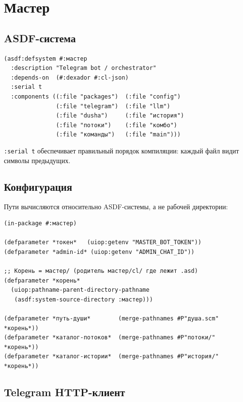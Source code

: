 \documentclass[11pt,a4paper]{article}
\begin{document}
\section{Мастер}

\subsection{ASDF-система}

\begin{lstlisting}[caption={мастер/cl/мастер.asd}]
(asdf:defsystem #:мастер
  :description "Telegram bot / orchestrator"
  :depends-on  (#:dexador #:cl-json)
  :serial t
  :components ((:file "packages")  (:file "config")
               (:file "telegram")  (:file "llm")
               (:file "dusha")     (:file "история")
               (:file "потоки")    (:file "комбо")
               (:file "команды")   (:file "main")))
\end{lstlisting}

\texttt{:serial t} обеспечивает правильный порядок компиляции: каждый файл видит символы предыдущих.

\subsection{Конфигурация}

Пути вычисляются относительно ASDF-системы, а не рабочей директории:

\begin{lstlisting}[caption={мастер/cl/config.lisp}]
(in-package #:мастер)

(defparameter *токен*   (uiop:getenv "MASTER_BOT_TOKEN"))
(defparameter *admin-id* (uiop:getenv "ADMIN_CHAT_ID"))

;; Корень = мастер/ (родитель мастер/cl/ где лежит .asd)
(defparameter *корень*
  (uiop:pathname-parent-directory-pathname
   (asdf:system-source-directory :мастер)))

(defparameter *путь-души*        (merge-pathnames #P"душа.scm"  *корень*))
(defparameter *каталог-потоков*  (merge-pathnames #P"потоки/"   *корень*))
(defparameter *каталог-истории*  (merge-pathnames #P"история/"  *корень*))
\end{lstlisting}

\subsection{Telegram HTTP-клиент}
\end{document}
